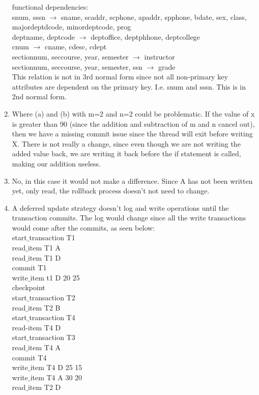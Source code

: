 \documentclass[12pt]{article}
\begin{document}
\begin{enumerate}
functional dependencies:\\
snum, sssn $\rightarrow$ sname, scaddr, scphone, apaddr, spphone, bdate, sex, class, majordeptdcode, minordeptcode, prog\\
deptname, deptcode $\rightarrow$ deptoffice, deptphhone, deptcollege\\
cnum $\rightarrow$ cname, cdesc, cdept\\
sectionnum, seccourse, year, semester $\rightarrow$ instructor\\
sectionnum, seccourse, year, semester, ssn $\rightarrow$ grade\\

This relation is not in 3rd normal form since not all non-primary key attributes are dependent on the primary key. I.e. snum and sssn. This is in 2nd normal form.

	\item Where (a) and (b) with m=2 and n=2 could be problematic. If the value of x is greater than 90 (since the addition and subtraction of m and n cancel out),
then we have a missing commit issue since the thread will exit before writing X. There is not really a change, since even though we are not writing the
added value back, we are writing it back before the if statement is called, making our addition useless.

	\item No, in this case it would not make a difference. Since A has not been written yet, only read, the rollback process doesn't not need to change.
	
	\item A deferred update strategy doesn't log and write operations until the transaction commits. The log would change since all the write transactions would come after
the commits, as seen below:\\

start$\_$transaction T1\\
read$\_$item T1 A\\
read$\_$item T1 D\\
commit T1\\
write$\_$item t1 D 20 25\\
checkpoint\\
start$\_$transaction T2\\
read$\_$item T2 B\\
start$\_$transaction T4\\
read-item T4 D\\
start$\_$transaction T3\\
read$\_$item T4 A\\
commit T4\\
write$\_$item T4 D 25 15\\
write$\_$item T4 A 30 20\\
read$\_$item T2 D\\


\end{enumerate}
\end{document}
